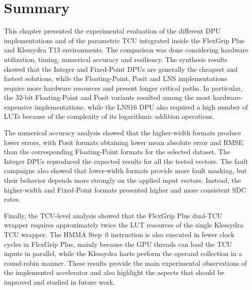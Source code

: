 \section{Summary}

This chapter presented the experimental evaluation of the different
DPU implementations and of the parametric TCU integrated inside the
FlexGrip Plus and Klessydra T13 environments. The comparison was done
considering hardware utilization, timing, numerical accuracy and
resiliency. The synthesis results showed that the Integer and
Fixed-Point DPUs are generally the cheapest and fastest solutions,
while the Floating-Point, Posit and LNS implementations require more
hardware resources and present longer critical paths. In particular,
the 32-bit Floating-Point and Posit variants resulted among the most
hardware-expensive implementations, while the LNS16 DPU also required
a high number of LUTs because of the complexity of its logarithmic
addition operations.

The numerical accuracy analysis showed that the higher-width formats
produce lower errors, with Posit formats obtaining lower mean absolute
error and RMSE than the corresponding Floating-Point formats for the
selected dataset. The Integer DPUs reproduced the expected results for
all the tested vectors. The fault campaigns also showed that lower-width formats provide more fault
masking, but their behavior depends more strongly on the applied input
vectors. Instead, the higher-width and Fixed-Point formats presented
higher and more consistent SDC rates.

Finally, the TCU-level analysis showed that the FlexGrip Plus
dual-TCU wrapper requires approximately twice the LUT resources of the
single Klessydra TCU wrapper. The HMMA Step~0 instruction is also
executed in fewer clock cycles in FlexGrip Plus, mainly because the GPU
threads can load the TCU inputs in parallel, while the Klessydra harts
perform the operand collection in a round-robin manner. These results provide the main
experimental observations of the implemented accelerator and also
highlight the aspects that should be improved and studied in future
work.


